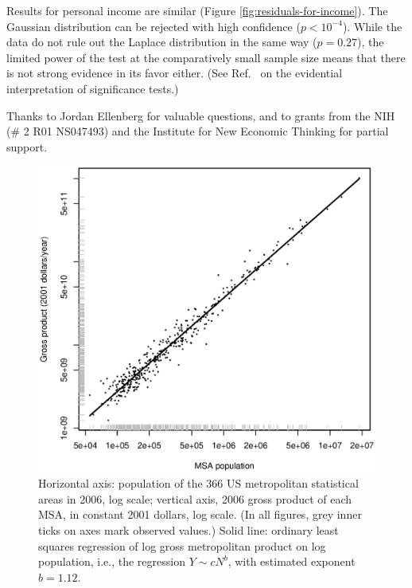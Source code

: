 \documentclass{pnastwo}
\begin{document}
\begin{article}
Results for personal income are similar (Figure
\ref{fig:residuals-for-income}).  The Gaussian distribution can be rejected
with high confidence ($p < {10}^{-4}$).  While the data do not rule out the
Laplace distribution in the same way ($p=0.27$), the limited power of the test
at the comparatively small sample size means that there is not strong evidence
in its favor either.  (See Ref.\ \cite{Mayo-Cox-frequentist} on the evidential
interpretation of significance tests.)




\begin{acknowledgments}
Thanks to Jordan Ellenberg for valuable questions,
and to grants from the NIH (\# 2 R01 NS047493) and the Institute for New
Economic Thinking for partial support.
\end{acknowledgments}



\end{article}


\begin{figure}
\includegraphics[width=\columnwidth]{gmp-2006}
\caption{Horizontal axis: population of the 366 US metropolitan statistical
  areas in 2006, log scale; vertical axis, 2006 gross product of each MSA, in
  constant 2001 dollars, log scale.  (In all figures, grey inner ticks on axes
  mark observed values.)  Solid line: ordinary least squares
  regression of log gross metropolitan product on log population, i.e., the
  regression $Y \sim c N^b$, with estimated exponent $\hat{b} = 1.12$.}
\label{fig:gmp-2006}
\end{figure}
\end{document}
